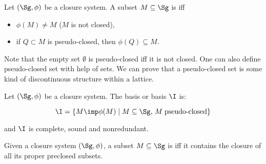 \begin{definition} Let $(\Sg, \phi)$ be a closure 
	system. A subset $M \subseteq \Sg$ is  iff 
	\begin{itemize}
		\item $\phi(M) \neq M$ ($M$ is not closed),
		\item if $Q \subset M$ is pseudo-closed, then $\phi(Q) \subseteq M$.
	\end{itemize}
	
\end{definition}

Note that the empty set $\emptyset$ is pseudo-closed iff it is not closed. One 
can also define pseudo-closed set with help of  sets. We
can prove that a pseudo-closed set is some kind of discontinuous structure 
within a lattice.

\begin{definition} Let $(\Sg, \phi)$ be a 
	closure system. The  basis or  
	basis
	$\I$ is:
	
	\[ \I = \{ M \imp \phi(M) \; | \; M \subseteq \Sg, \, M \;
	\text{pseudo-closed} \} \]
	
	\noindent and $\I$ is complete, sound and nonredundant.
\end{definition}


\begin{definition} Given a closure system $(\Sg, \phi)$,
	a subset $M \subseteq \Sg$ is  iff it contains the 
	closure of
	all its proper preclosed subsets.
	
\end{definition}